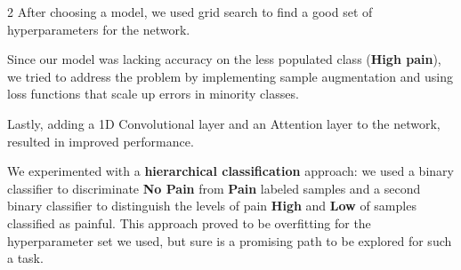 \documentclass[11pt]{article}
\begin{document}
\begin{multicols}{2}
        After choosing a model, we used grid search to find a good set of hyperparameters for the network.

        Since our model was lacking accuracy on the less populated class (\textbf{High pain}), we tried to address the problem by implementing  sample augmentation and using loss functions that scale up errors in minority classes.

        Lastly, adding a 1D Convolutional layer and an Attention layer to the network, resulted in improved performance.
        
        We experimented with a \textbf{hierarchical classification} approach: we used a binary classifier to discriminate \textbf{No Pain} from \textbf{Pain} labeled samples and a second binary classifier to distinguish the levels of pain \textbf{High} and \textbf{Low} of samples classified as painful. This approach proved to be overfitting for the hyperparameter set we used, but sure is a promising path to be explored for such a task.
        
        

    

\end{multicols}
\end{document}
